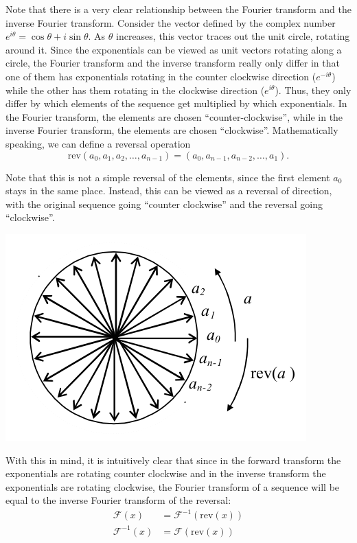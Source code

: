 \documentclass[11pt]{article}
\begin{document}
Note that there is a very clear relationship between the Fourier transform and the inverse Fourier
transform. Consider the vector defined by the complex number $e^{i\theta} = \cos\theta +
i\sin\theta$. As $\theta$ increases, this vector traces out the unit circle, rotating around it.
Since the exponentials can be viewed as unit vectors rotating along a circle, the Fourier transform
and the inverse transform really only differ in that one of them has exponentials rotating in the
counter clockwise direction ($e^{-i\theta}$) while the other has them rotating in the clockwise
direction ($e^{i\theta}$). Thus, they only differ by which elements of the sequence get multiplied
by which exponentials. In the Fourier transform, the elements are chosen ``counter-clockwise'',
while in the inverse Fourier transform, the elements are chosen ``clockwise''. Mathematically
speaking, we can define a reversal operation 
\[\text{rev}(a_0, a_1, a_2, \ldots, a_{n-1}) = (a_0, a_{n-1}, a_{n-2}, \ldots, a_1).\]

Note that this is not a simple reversal of the elements, since the first element $a_0$ stays in the
same place. Instead, this can be viewed as a reversal of direction, with the original sequence going
``counter clockwise'' and the reversal going ``clockwise''.

\begin{center}
    \includegraphics[scale=0.7]{images/reversal.png}
\end{center}

With this in mind, it is intuitively clear that since in the forward transform the exponentials are
rotating counter clockwise and in the inverse transform the exponentials are rotating clockwise, the
Fourier transform of a sequence will be equal to the inverse Fourier transform of the reversal:
\begin{align*}
    \mathcal{F}(x) &= \mathcal{F}^{-1}(\text{rev}(x)) \\
    \mathcal{F}^{-1}(x) &= \mathcal{F}(\text{rev}(x))
\end{align*}
\end{document}
